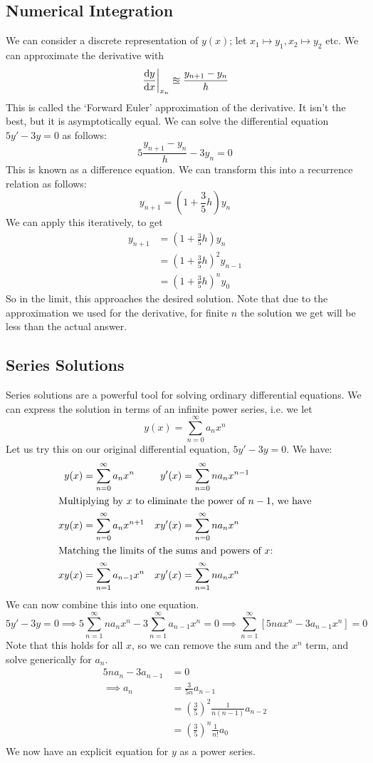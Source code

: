 \documentclass{article}
\begin{document}
	\subsection{Numerical Integration}
	We can consider a discrete representation of $y(x)$; let $x_1 \mapsto y_1, x_2 \mapsto y_2$ etc. We can approximate the derivative with
	\[ \eval{\frac{\dd y}{\dd x}}_{x_n} \approxeq \frac{y_{n+1} - y_n}{h} \]
	This is called the `Forward Euler' approximation of the derivative. It isn't the best, but it is asymptotically equal. We can solve the differential equation $5y' - 3y = 0$ as follows:
	\[ 5 \frac{y_{n+1} - y_n}{h} - 3y_n = 0 \]
	This is known as a difference equation. We can transform this into a recurrence relation as follows:
	\[ y_{n+1} = \left( 1 + \frac{3}{5}h \right) y_n \]
	We can apply this iteratively, to get
	\begin{align*}
		y_{n+1} &= \left( 1 + \frac{3}{5}h \right) y_n \\
		&= \left( 1 + \frac{3}{5}h \right)^2 y_{n-1} \\
		&= \left( 1 + \frac{3}{5}h \right)^n y_{0}
	\end{align*}
	So in the limit, this approaches the desired solution. Note that due to the approximation we used for the derivative, for finite $n$ the solution we get will be less than the actual answer.
	
	\subsection{Series Solutions}
	Series solutions are a powerful tool for solving ordinary differential equations. We can express the solution in terms of an infinite power series, i.e. we let
	\[ y(x) = \sum_{n=0}^\infty a_nx^n \]
	Let us try this on our original differential equation, $5y' - 3y = 0$. We have:
	\begin{align*}
		y(x) &= \sum_{n=0}^\infty a_nx^n & y'(x) &= \sum_{n=0}^\infty na_nx^{n-1} \\
		\intertext{Multiplying by $x$ to eliminate the power of $n-1$, we have}
		xy(x) &= \sum_{n=0}^\infty a_nx^{n+1} & xy'(x) &= \sum_{n=0}^\infty na_nx^n \\
		\intertext{Matching the limits of the sums and powers of $x$:}
		xy(x) &= \sum_{n=1}^\infty a_{n-1}x^n & xy'(x) &= \sum_{n=1}^\infty na_nx^n \\
	\end{align*}
	We can now combine this into one equation.
	\[ 5y' - 3y = 0 \implies 5\sum_{n=1}^\infty na_nx^n - 3\sum_{n=1}^\infty a_{n-1}x^n = 0 \implies \sum_{n=1}^\infty \left[ 5nax^n - 3a_{n-1}x^n \right] = 0 \]
	Note that this holds for all $x$, so we can remove the sum and the $x^n$ term, and solve generically for $a_n$.
	\begin{align*}
		5na_n - 3a_{n-1} &= 0 \\
		\implies a_n &= \frac{3}{5n} a_{n-1} \\
		&= \left(\frac{3}{5}\right)^2 \frac{1}{n(n-1)} a_{n-2} \\
		&= \left(\frac{3}{5}\right)^n \frac{1}{n!} a_{0} \\
	\end{align*}
	We now have an explicit equation for $y$ as a power series.
	
\end{document}

